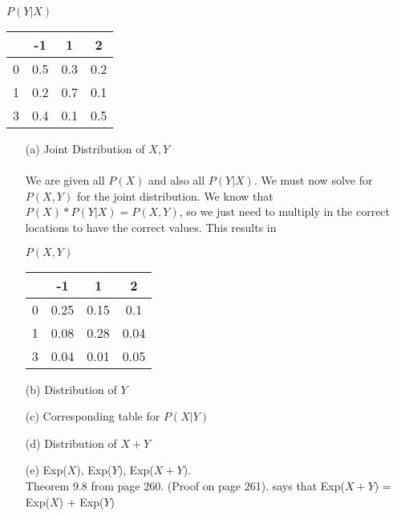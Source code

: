 \documentclass[11pt]{article}
\begin{document}
\begin{center}
{\Large \textbf{$P(Y | X)$}}\\ 
  \begin{tabular}{ r || c | c | c |}
	 & -1 & 1 & 2 \\ \hline
	 0 & 0.5 & 0.3 & 0.2\\ \hline   
    1 & 0.2 & 0.7 & 0.1 \\ \hline
    3 & 0.4 & 0.1 & 0.5 \\ \hline
    \hline
  \end{tabular}
\end{center}
\begin{enumerate}
\item[(a)] Joint Distribution of $X, Y$\\ \\
We are given all $P(X)$ and also all $P(Y | X)$.  We must now solve for $P(X, Y)$ for the joint distribution.  We know that $P(X) * P(Y | X) = P(X, Y)$, so we just need to multiply in the correct locations to have the correct values.  This results in \\
\begin{center}
{\Large \textbf{$P(X, Y)$}}\\ 
  \begin{tabular}{ r || c | c | c |}
	 & -1 & 1 & 2 \\ \hline
	 0 & 0.25 & 0.15 & 0.1\\ \hline   
    1 & 0.08 & 0.28 & 0.04 \\ \hline
    3 & 0.04 & 0.01 & 0.05 \\ \hline
    \hline
  \end{tabular}
\end{center}

\item[(b)] Distribution of $Y$
\item[(c)] Corresponding table for $P(X|Y)$
\item[(d)] Distribution of $X + Y$
\item[(e)] Exp($X$), Exp($Y$), Exp($X + Y$).
\\
Theorem 9.8 from page 260.  (Proof on page 261). says that Exp($X + Y$) = Exp($X$) + Exp($Y$)
\end{enumerate}
\end{document}
